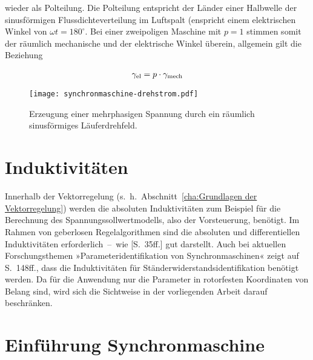 wieder als Polteilung.
Die Polteilung entspricht der Länder einer Halbwelle der sinusförmigen Flussdichteverteilung im Luftspalt (enspricht einem elektrischen Winkel von $\omega t = 180^{\circ}$.
Bei einer zweipoligen Maschine mit $p=1$ stimmen somit der räumlich mechanische und der elektrische Winkel überein, allgemein gilt die Beziehung \autocite[S.141f.]{fischer2009}

\begin{align}
\gamma_{\mathrm{el}} = p\cdot \gamma_{\mathrm{mech}}
\end{align}

\begin{figure}[!htb]
\centering
\texttt{[image: synchronmaschine-drehstrom.pdf]}
\label{fig:drehstromwicklung}
\caption{Erzeugung einer mehrphasigen Spannung durch ein räumlich sinusförmiges Läuferdrehfeld.}
\end{figure}

\section{Induktivitäten}\label{sec:induktiv}

Innerhalb der Vektorregelung (s.~h.~Abschnitt~\ref{cha:Grundlagen der Vektorregelung}) werden die absoluten Induktivitäten zum Beispiel für die Berechnung des Spannungssollwertmodells, also der Vorsteuerung, benötigt.
Im Rahmen von geberlosen Regelalgorithmen sind die absoluten und differentiellen Induktivitäten erforderlich~--~wie \autocite{kellner2012}[S.~35ff.] gut darstellt.
Auch bei aktuellen Forschungsthemen »Parameteridentifikation von Synchronmaschinen« zeigt \autocite{kellner2012} auf S.~148ff., dass die Induktivitäten für Ständerwiderstandsidentifikation benötigt werden.
Da für die Anwendung nur die Parameter in rotorfesten Koordinaten von Belang sind, wird sich die Sichtweise in der vorliegenden Arbeit darauf beschränken.
 

\section{Einführung Synchronmaschine}\label{sec:synchron}

